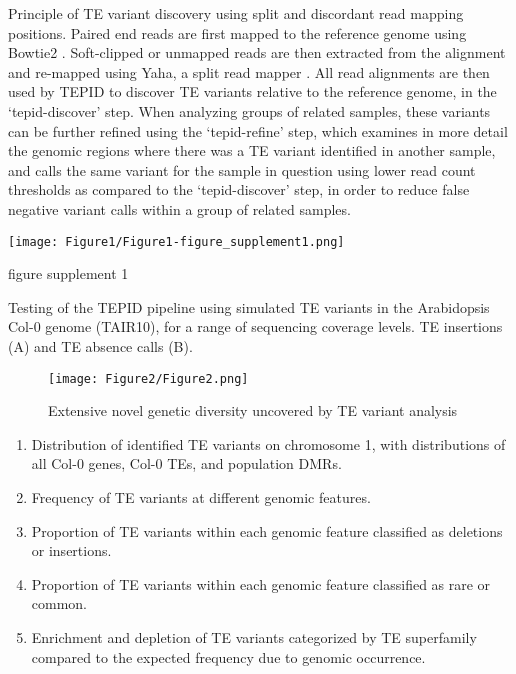 \documentclass[12pt]{article}
\begin{document}
Principle of TE variant discovery using split and discordant read
mapping positions. Paired end reads are first mapped to the reference
genome using Bowtie2 \cite{Langmead:2012jh}. Soft-clipped or unmapped
reads are then extracted from the alignment and re-mapped using Yaha, a
split read mapper \cite{Faust:2012ic}. All read alignments are then used
by TEPID to discover TE variants relative to the reference genome, in
the `tepid-discover' step. When analyzing groups of related samples,
these variants can be further refined using the `tepid-refine' step,
which examines in more detail the genomic regions where there was a TE
variant identified in another sample, and calls the same variant for the
sample in question using lower read count thresholds as compared to the
`tepid-discover' step, in order to reduce false negative variant calls
within a group of related samples.

\pagebreak



\begin{suppfigure}[h]
  \centering
  \texttt{[image: Figure1/Figure1-figure\_supplement1.png]}
  \caption{figure supplement 1}
  \label{fig1s1}
\end{suppfigure}

Testing of the TEPID pipeline using simulated TE variants in the
Arabidopsis Col-0 genome (TAIR10), for a range of sequencing coverage
levels. TE insertions (A) and TE absence calls (B).

\pagebreak



\begin{figure}[h]
  \centering
  \texttt{[image: Figure2/Figure2.png]}
  \caption{Extensive novel genetic diversity uncovered by TE variant analysis}
  \label{fig2}
\end{figure}


\begin{enumerate}
\def\labelenumi{(\Alph{enumi})}
\item
  Distribution of identified TE variants on chromosome 1, with
  distributions of all Col-0 genes, Col-0 TEs, and population DMRs.
\item
  Frequency of TE variants at different genomic features.
\item
  Proportion of TE variants within each genomic feature classified as
  deletions or insertions.
\item
  Proportion of TE variants within each genomic feature classified as
  rare or common.
\item
  Enrichment and depletion of TE variants categorized by TE superfamily
  compared to the expected frequency due to genomic occurrence.
\end{enumerate}
\end{document}
